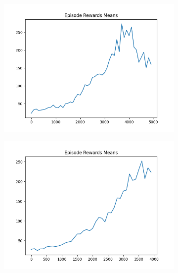 \begin{figure}[H]
\begin{subfigure}{.47\linewidth}
        \includegraphics[width=\textwidth]{pole/2024-06-13_22-34-12_dqn_cartpole_episode_rewards_means.png}
    \end{subfigure}
    \begin{subfigure}{.47\linewidth}
        \centering
        \includegraphics[width=\textwidth]{pole/2024-06-14_09-34-50_dqn_cartpole_episode_rewards_means.png}
    \end{subfigure}
\end{figure}
